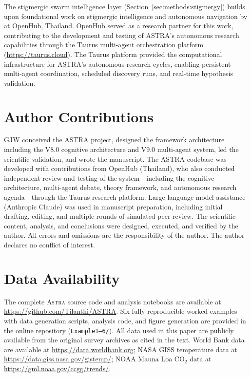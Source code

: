\documentclass[usenatbib]{rasti}
\newcommand{\astra}{\textsc{Astra}\xspace}
\begin{document}
The stigmergic swarm intelligence layer (Section~\ref{sec:methods:stigmergy}) builds upon foundational work on stigmergic intelligence and autonomous navigation by \citet{Dey2025} at OpenHub, Thailand.
OpenHub served as a research partner for this work, contributing to the development and testing of ASTRA's autonomous research capabilities through the Taurus multi-agent orchestration platform (\url{https://taurus.cloud}).
The Taurus platform provided the computational infrastructure for ASTRA's autonomous research cycles, enabling persistent multi-agent coordination, scheduled discovery runs, and real-time hypothesis validation.

\section*{Author Contributions}

GJW conceived the ASTRA project, designed the framework architecture including the V8.0 cognitive architecture and V9.0 multi-agent system, led the scientific validation, and wrote the manuscript.
The ASTRA codebase was developed with contributions from OpenHub (Thailand), who also conducted independent review and testing of the system---including the cognitive architecture, multi-agent debate, theory framework, and autonomous research agenda---through the Taurus research platform.
Large language model assistance (Anthropic Claude) was used in manuscript preparation, including initial drafting, editing, and multiple rounds of simulated peer review.
The scientific content, analysis, and conclusions were designed, executed, and verified by the author.
All errors and omissions are the responsibility of the author.
The author declares no conflict of interest.

\section*{Data Availability}

The complete \astra source code and analysis notebooks are available at \url{https://github.com/Tilanthi/ASTRA}.
Six fully reproducible worked examples with data generation scripts, analysis code, and figure generation are provided in the online repository (\texttt{Example1--6/}).
All data used in this paper are publicly available from the original survey archives as cited in the text.
World Bank data are available at \url{https://data.worldbank.org}; NASA GISS temperature data at \url{https://data.giss.nasa.gov/gistemp/}; NOAA Mauna Loa CO$_{2}$ data at \url{https://gml.noaa.gov/ccgg/trends/}.



\end{document}
